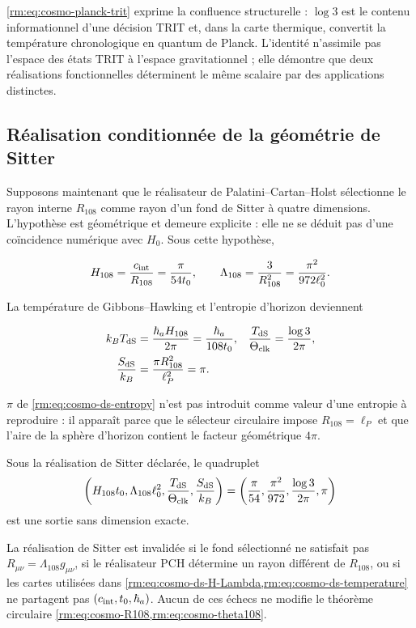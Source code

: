 \cref{rm:eq:cosmo-planck-trit} exprime la confluence structurelle : \(\log3\) est le contenu informationnel d’une décision TRIT et, dans la carte thermique, convertit la température chronologique en quantum de Planck. L’identité n’assimile pas l’espace des états TRIT à l’espace gravitationnel ; elle démontre que deux réalisations fonctionnelles déterminent le même scalaire par des applications distinctes.

\subsection{Réalisation conditionnée de la géométrie de Sitter}

Supposons maintenant que le réalisateur de Palatini--Cartan--Holst sélectionne le rayon interne \(R_{108}\) comme rayon d’un fond de Sitter à quatre dimensions. L’hypothèse est géométrique et demeure explicite : elle ne se déduit pas d’une coïncidence numérique avec \(H_0\). Sous cette hypothèse,

\begin{equation}
H_{108}=\frac{c_{\rm int}}{R_{108}}
=\frac{\pi}{54t_0},
\qquad
\Lambda_{108}=\frac{3}{R_{108}^2}
=\frac{\pi^2}{972\ell_0^2}.
\label{rm:eq:cosmo-ds-H-Lambda}
\end{equation}

La température de Gibbons--Hawking et l’entropie d’horizon deviennent

\begin{align}
k_BT_{\rm dS}
&=\frac{\hbar_a H_{108}}{2\pi}
=\frac{\hbar_a}{108t_0},
&
\frac{T_{\rm dS}}{\Theta_{\rm clk}}
&=\frac{\log3}{2\pi},
\label{rm:eq:cosmo-ds-temperature}\\
\frac{S_{\rm dS}}{k_B}
&=\frac{\pi R_{108}^2}{\ell_P^2}=\pi.
\label{rm:eq:cosmo-ds-entropy}
\end{align}

\(\pi\) de \cref{rm:eq:cosmo-ds-entropy} n’est pas introduit comme valeur d’une entropie à reproduire : il apparaît parce que le sélecteur circulaire impose \(R_{108}=\ell_P\) et que l’aire de la sphère d’horizon contient le facteur géométrique \(4\pi\).

\begin{proposition}
Sous la réalisation de Sitter déclarée, le quadruplet
\[
\left(
H_{108}t_0,
\Lambda_{108}\ell_0^2,
\frac{T_{\rm dS}}{\Theta_{\rm clk}},
\frac{S_{\rm dS}}{k_B}
\right)
=\left(
\frac\pi{54},
\frac{\pi^2}{972},
\frac{\log3}{2\pi},
\pi
\right)
\]
est une sortie sans dimension exacte.
\end{proposition}

\begin{falsifier}
La réalisation de Sitter est invalidée si le fond sélectionné ne satisfait pas \(R_{\mu\nu}=\Lambda_{108}g_{\mu\nu}\), si le réalisateur PCH détermine un rayon différent de \(R_{108}\), ou si les cartes utilisées dans \cref{rm:eq:cosmo-ds-H-Lambda,rm:eq:cosmo-ds-temperature} ne partagent pas \((c_{\rm int},t_0,\hbar_a)\). Aucun de ces échecs ne modifie le théorème circulaire \cref{rm:eq:cosmo-R108,rm:eq:cosmo-theta108}.
\end{falsifier}
